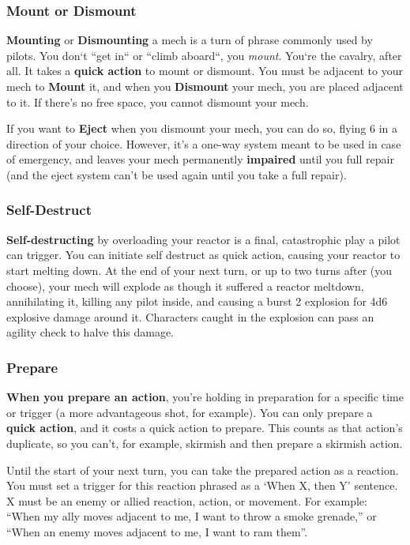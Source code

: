 \subsubsection{Mount or Dismount}
\textbf{Mounting} or \textbf{Dismounting} a mech is a turn of phrase commonly used by pilots. You don‘t “get in“ or “climb aboard“, you \textit{mount}. You‘re the cavalry, after all. It takes a \textbf{quick action} to mount or dismount. You must be adjacent to your mech to \textbf{Mount} it, and when you \textbf{Dismount} your mech, you are placed adjacent to it. If there’s no free space, you cannot dismount your mech.

If you want to \textbf{Eject} when you dismount your mech, you can do so, flying 6 in a direction of your choice. However, it’s a one-way system meant to be used in case of emergency, and leaves your mech permanently \textbf{impaired} until you full repair (and the eject system can’t be used again until you take a full repair).


\subsubsection{Self-Destruct}
\textbf{Self-destructing} by overloading your reactor is a final, catastrophic play a pilot can trigger. You can initiate self destruct as quick action, causing your reactor to start melting down. At the end of your next turn, or up to two turns after (you choose), your mech will explode as though it suffered a reactor meltdown, annihilating it, killing any pilot inside, and causing a burst 2 explosion for 4d6 explosive damage around it. Characters caught in the explosion can pass an agility check to halve this damage.

\subsubsection{Prepare}
\textbf{When you prepare an action}, you’re holding in preparation for a specific time or trigger (a more advantageous shot, for example). You can only prepare a \textbf{quick action}, and it costs a quick action to prepare. This counts as that action’s duplicate, so you can’t, for example, skirmish and then prepare a skirmish action.

Until the start of your next turn, you can take the prepared action as a reaction. You must set a trigger for this reaction phrased as a ‘When X, then Y’ sentence. X must be an enemy or allied reaction, action, or movement. For example: “When my ally moves adjacent to me, I want to throw a smoke grenade,” or “When an enemy moves adjacent to me, I want to ram them”.

